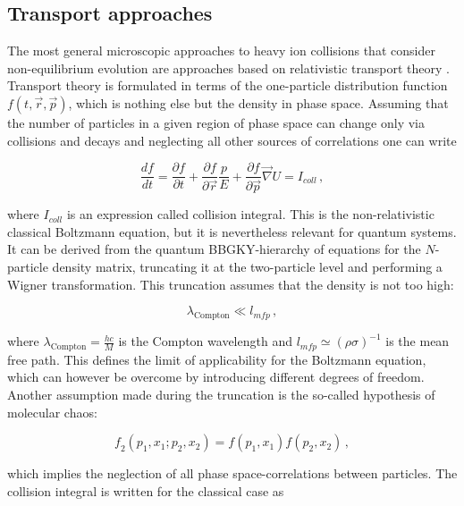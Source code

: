 \subsection{Transport approaches} \label{sec:transport}

The most general microscopic approaches to heavy ion collisions that consider
non-equilibrium evolution are approaches based on relativistic transport theory
\cite{de_Groot}.  Transport theory is formulated in terms of the
one-particle distribution function $\mathit{f}(t,\vec{r},\vec{p})$, which is
nothing else but the density in phase space. Assuming that the number of
particles in a given region of phase space can change only via collisions and
decays and neglecting all other sources of correlations one can write

\begin{equation} \label{eq:boltzmann}
  \frac{d\mathit{f}}{dt} = \frac{\partial\mathit{f}}{\partial t} +
                           \frac{\partial\mathit{f}}{\partial \vec{r}} \frac{p}{E} +
                           \frac{\partial\mathit{f}}{\partial \vec{p}} \vec{\nabla}U  = I_{coll} \,,
\end{equation}

where $I_{coll}$ is an expression called collision integral. This is the
non-relativistic classical Boltzmann equation, but it is nevertheless relevant for
quantum systems. It can be derived from the quantum BBGKY-hierarchy of
equations for the $N$-particle density matrix, truncating it at the two-particle
level and performing a Wigner transformation. This truncation assumes that the density
is not too high:

\begin{equation} \label{eq:transport_appl}
  \lambda_{\mathrm{Compton}} \ll l_{mfp} \,,
\end{equation}

where $\lambda_{\mathrm{Compton}} = \frac{hc}{M}$ is the Compton wavelength and
$l_{mfp} \simeq (\rho \sigma)^{-1}$ is the mean free path. This defines
the limit of applicability for the Boltzmann equation, which can however be overcome by
introducing different degrees of freedom. Another assumption made during the
truncation is the so-called hypothesis of molecular chaos:

\begin{equation} \label{eq:molecular_chaos}
  \mathit{f}_2(p_1,x_1;p_2,x_2) = \mathit{f}(p_1,x_1) \mathit{f}(p_2,x_2) \,,
\end{equation}

which implies the neglection of all phase space-correlations between particles.
The collision integral is written for the classical case as


